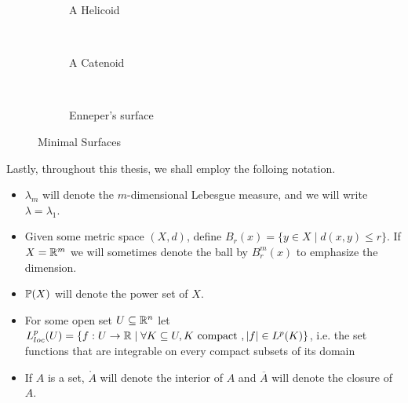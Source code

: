 \begin{example}
\begin{figure}
\begin{subfigure}[b]{0.3\textwidth}
\begin{tikzpicture}
        \end{tikzpicture}
        \caption{A Helicoid}
        \label{fig: helicoid}
    \end{subfigure}
    ~ 
    \begin{subfigure}[b]{0.3\textwidth}
        \caption{A Catenoid}
        \label{fig: catenoid}
    \end{subfigure}
    ~ 
    \begin{subfigure}[b]{0.3\textwidth}
        \caption{Enneper's surface}
        \label{fig: enneper}
    \end{subfigure}
    \caption{Minimal Surfaces}\label{fig: minimal surfaces}
\end{figure}
\end{example}

Lastly, throughout this thesis, we shall employ the folloing notation.
\begin{itemize}
\item $\lambda_{m}$ will denote the $m$-dimensional Lebesgue measure, and we will write $\lambda=\lambda_1$.
\item Given some metric space $(X,d)$, define $B_{r}(x)=\{y \in X \mid d(x,y) \le r\}$. If $X = \R^{m}$ we will sometimes denote the ball by $B_{r}^{m}(x)$ to emphasize the dimension.
\item $\pow{X}$ will denote the power set of $X$.
\item For some open set $U \subseteq \R^n$ let $L^{p}_{loc}(U) = \{f : U \to \R \mid \forall K \subseteq U, K \text{ compact }, |f| \in L^p(K)\}$, i.e. the set functions that are integrable on every compact subsets of its domain
\item If $A$ is a set, $\mathring{A}$ will denote the interior of $A$ and $\overline{A}$ will denote the closure of $A$.
\end{itemize}